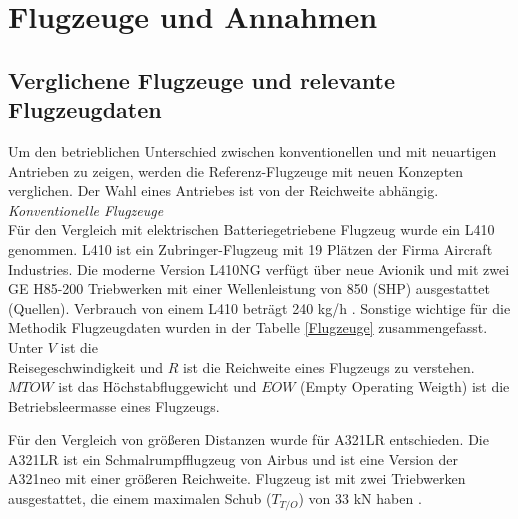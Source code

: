 \section{Flugzeuge und Annahmen}
\subsection{Verglichene Flugzeuge und relevante Flugzeugdaten}
\label{ss:Relevante Flugzeugdaten}
%
Um den betrieblichen Unterschied zwischen konventionellen und mit neuartigen Antrieben zu zeigen, werden die Referenz-Flugzeuge mit neuen 
Konzepten verglichen. 
Der Wahl eines Antriebes ist von der Reichweite abhängig.\\
\textit{Konventionelle Flugzeuge}\\
Für den Vergleich mit elektrischen Batteriegetriebene Flugzeug wurde ein L410 genommen. 
L410 ist ein Zubringer-Flugzeug mit 19 Plätzen der Firma Aircraft Industries. 
Die moderne Version L410NG verfügt über neue Avionik und mit zwei GE H85-200 Triebwerken mit einer Wellenleistung von 850 (SHP) ausgestattet (Quellen).
Verbrauch von einem L410 beträgt 240 kg/h \cite{let2016l410}. Sonstige wichtige für die Methodik Flugzeugdaten wurden in der Tabelle \ref{Flugzeuge} zusammengefasst.
Unter $V$ ist die \\ Reisegeschwindigkeit und $R$ ist die Reichweite eines Flugzeugs zu verstehen. $MTOW$ ist das Höchstabfluggewicht 
und $EOW$ (Empty Operating Weigth) ist die Betriebsleermasse eines Flugzeugs.

Für den Vergleich von größeren Distanzen wurde für A321LR entschieden. 
Die A321LR ist ein Schmalrumpfflugzeug von Airbus und ist eine Version der A321neo mit einer größeren Reichweite.
Flugzeug ist mit zwei Triebwerken ausgestattet, die einem maximalen Schub ($T_{T/O}$) von 33 kN haben \cite{eurocontrol_a321}.

